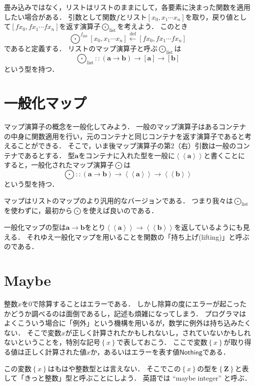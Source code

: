 \documentclass[twocolumn]{jsbook}
\newcommand{\defeq}{\xleftarrow{\text{def}}}
\newcommand{\mapfunc}{\bigodot} %
\newcommand{\typename}[1]{\bm{#1}}
\newcommand{\integertype}{\typename{Z}}
\newcommand{\generalcontainer}[1]{\left\langle\!\left\langle#1\right\rangle\!\right\rangle}
\newcommand{\listtype}[1]{\left[#1\right]}
\newcommand{\maybe}[1]{\left\{#1\right\}}
\newcommand{\specialkeyword}[1]{\textsf{#1}}
\newcommand{\nothing}{\specialkeyword{Nothing}}
\begin{document}
畳み込みではなく，リストはリストのままにして，各要素に決まった関数を適用したい場合がある．
引数として関数$f$とリスト$[x_0,x_1\dotsb x_n]$を取り，戻り値として$[fx_0,fx_1\dotsb fx_n]$を返す演算子$\mapfunc_\text{list}$を考えよう．
このとき$$\mapfunc^f\nolimits_\text{list}[x_0,x_1\dotsb x_n]\defeq [fx_0,fx_1\dotsb fx_n]$$であると定義する．
リストのマップ演算子と呼ぶ$\mapfunc_\text{list}$は$$\mapfunc\nolimits_\text{list}::(\typename{a}\rightarrow\typename{b})\rightarrow\listtype{\typename{a}}\rightarrow\listtype{\typename{b}}$$という型を持つ．


\section{一般化マップ}

マップ演算子の概念を一般化してみよう．
一般のマップ演算子はあるコンテナの中身に関数適用を行い，元のコンテナと同じコンテナを返す演算子であると考えることができる．
そこで，いま後マップ演算子の第2（右）引数は一般のコンテナであるとする．
型$\typename{a}$をコンテナに入れた型を一般に$\generalcontainer{\typename{a}}$と書くことにすると，一般化されたマップ演算子$\mapfunc$は$$\mapfunc::(\typename{a}\rightarrow\typename{b})\rightarrow\generalcontainer{\typename{a}}\rightarrow\generalcontainer{\typename{b}}$$という型を持つ．

マップはリストのマップのより汎用的なバージョンである．
つまり我々は$\mapfunc_\text{list}$を使わずに，最初から$\mapfunc$を使えば良いのである．

一般化マップの型は$\typename{a}\rightarrow\typename{b}$をとり$\generalcontainer{\typename{a}}\rightarrow\generalcontainer{\typename{b}}$を返しているようにも見える．
それゆえ一般化マップを用いることを関数の「持ち上げ(lifting)」と呼ぶのである．

\section{Maybe}

整数$x$を$0$で除算することはエラーである．
しかし除算の度にエラーが起こったかどうか調べるのは面倒であるし，記述も煩雑になってしまう．
プログラマはよくこういう場合に「例外」という機構を用いるが，数学に例外は持ち込みたくない．
そこで変数$x$が正しく計算されたかもしれないし，されていないかもしれないということを，特別な記号$\maybe{x}$で表しておこう．
ここで変数$\maybe{x}$が取り得る値は正しく計算された値$x$か，あるいはエラーを表す値$\nothing$である．

この変数$\maybe{x}$はもはや整数型とは言えない．
そこでこの$\maybe{x}$の型を$\maybe{\integertype}$と表して「きっと整数」型と呼ぶことにしよう．
英語では ``maybe integer'' と呼ぶ．
\end{document}
